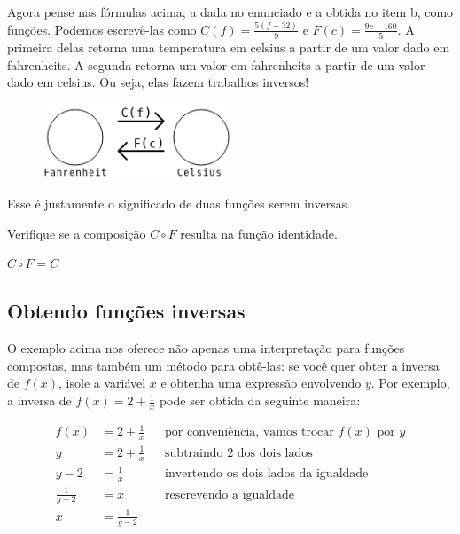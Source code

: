 \documentclass[main.tex]{subfiles}
\begin{document}
Agora pense nas fórmulas acima, a dada no enunciado e a obtida no item b, como funções. Podemos escrevê-las como $C(f)=\frac{5(f-32)}{9}$ e $F(c)=\frac{9c+160}{5}$. A primeira delas retorna uma temperatura em celsius a partir de um valor dado em fahrenheits. A segunda retorna um valor em fahrenheits a partir de um valor dado em celsius. Ou seja, elas fazem trabalhos inversos!

\begin{figure}[h]
\centering
\includegraphics[width=0.5\textwidth]{./img/c5q9.png}
\end{figure}

Esse é justamente o significado de duas funções serem inversas. 

\begin{questao}
Verifique se a composição $C \circ F$ resulta na função identidade.
\end{questao}


\begin{gabarito}
	\begin{gabaritoQuestao}
		$C \circ F=C$
	\end{gabaritoQuestao}
\end{gabarito}

\subsection*{Obtendo funções inversas}

O exemplo acima nos oferece não apenas uma interpretação para funções compostas, mas também um método para obtê-las: se você quer obter a inversa de $f(x)$, isole a variável $x$ e obtenha uma expressão envolvendo $y$. Por exemplo, a inversa de $f(x)=2+\frac{1}{x}$ pode ser obtida da seguinte maneira:

\begin{align*}
 f(x) &=2+\frac{1}{x} && \text{por conveniência, vamos trocar } f(x) \text{ por } y \\
 y &= 2+\frac{1}{x} && \text{subtraindo 2 dos dois lados}\\ 
 y-2 &= \frac{1}{x}  && \text{invertendo os dois lados da igualdade}\\
 \frac{1}{y-2} &= x && \text{rescrevendo a igualdade}\\
 x &= \frac{1}{y-2}
\end{align*}
\end{document}
